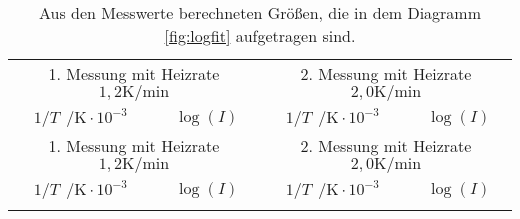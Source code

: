 \begin{longtable}{c c || c c}
  \caption{Aus den Messwerte berechneten Größen, die in dem Diagramm \ref{fig:logfit} aufgetragen sind.}
  \label{tab:nahrung}\\

  \toprule
  \multicolumn{2}{c}{1. Messung mit Heizrate $1,2 \si{\kelvin\per\minute}$ } & \multicolumn{2}{c}{2. Messung mit Heizrate $2,0 \si{\kelvin\per\minute}$ }\\
  $1/T \ \ \si{\per\kelvin} \cdot 10^{-3}$  & $\log(I)$ & $1/T \ \ \si{\per\kelvin} \cdot 10^{-3}$  & $\log(I)$\\
  \midrule
  \endfirsthead
  \hline
  \multicolumn{2}{c}{1. Messung mit Heizrate $1,2 \si{\kelvin\per\minute}$ } & \multicolumn{2}{c}{2. Messung mit Heizrate $2,0 \si{\kelvin\per\minute}$ }\\
  $1/T \ \ \si{\per\kelvin} \cdot 10^{-3}$  & $\log(I)$ & $1/T \ \ \si{\per\kelvin} \cdot 10^{-3}$  & $\log(I)$\\
  \midrule
  \endhead
  \hline
  \endfoot
  \bottomrule
  \endlastfoot


\end{longtable}
